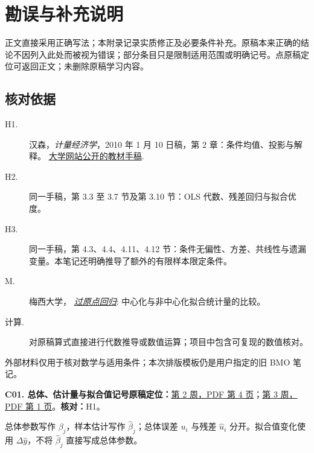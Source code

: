 \chapter{勘误与补充说明}

\label{app:errata}

正文直接采用正确写法；本附录记录实质修正及必要条件补充。原稿本来正确的结论不因列入此处而被视为错误；部分条目只是限制适用范围或明确记号。点原稿定位可返回正文；未删除原稿学习内容。

\section*{核对依据}

\begin{description}

\item[H1.] 汉森，\emph{计量经济学}，2010 年 1 月 10 日稿，第 2 章：条件均值、投影与解释。 \href{https://users.ssc.wisc.edu/~xshi28/Econometrics_Hansen.pdf}{大学网站公开的教材手稿}.

\item[H2.] 同一手稿，第 3.3 至 3.7 节及第 3.10 节：OLS 代数、残差回归与拟合优度。

\item[H3.] 同一手稿，第 4.3、4.4、4.11、4.12 节：条件无偏性、方差、共线性与遗漏变量。本笔记还明确推导了额外的有限样本限定条件。

\item[M.] 梅西大学， \href{https://r-resources.massey.ac.nz/161251/lectures/RegressionOrigin.html}{\emph{过原点回归}}: 中心化与非中心化拟合统计量的比较。

\item[计算.] 对原稿算式直接进行代数推导或数值运算；项目中包含可复现的数值核对。

\end{description}

外部材料仅用于核对数学与适用条件；本次排版模板仍是用户指定的旧 BMO 笔记。

\par\medskip\noindent\begin{minipage}{\linewidth}

\label{err:notation}

\textbf{C01. 总体、估计量与拟合值记号}\quad\textbf{原稿定位：}\hyperref[src:w2p4]{第 2 周，PDF 第 4 页}；\hyperref[src:w3p1]{第 3 周，PDF 第 1 页}。\quad\textbf{核对：}H1。\par

总体参数写作 $\beta_j$，样本估计写作 $\hat\beta_j$；总体误差 $u_i$ 与残差 $\hat u_i$ 分开。拟合值变化使用 $\Delta\hat y$，不将 $\hat\beta_j$ 直接写成总体参数。

\end{minipage}\par

